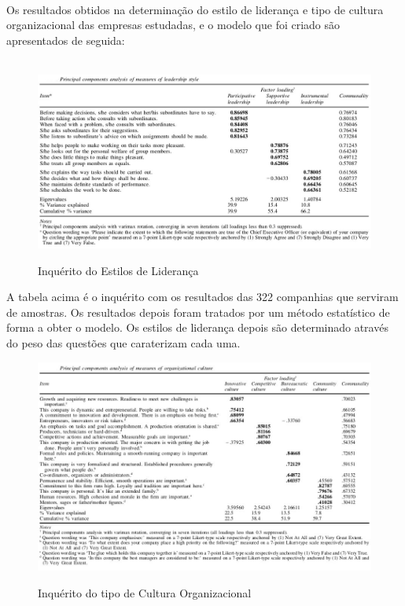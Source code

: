 \vspace{1cm}\\
Os resultados obtidos na determinação do estilo de liderança e tipo de cultura organizacional das empresas estudadas, e o modelo que foi criado são apresentados de seguida:\\
\\
\begin{figure}[H]
\centering
\includegraphics[scale=.5]{./image/OB/Leadership.jpg}\\
\caption{Inquérito do Estilos de Liderança \cite{article_1}}
\end{figure}\par
\newpage
A tabela acima é o inquérito com os resultados das 322 companhias que serviram de amostras. Os resultados depois foram tratados por um método estatístico de forma a obter o modelo. Os estilos de liderança depois são determinado através do peso das questões que caraterizam cada uma.
\vspace{1cm}
\begin{figure}[H]
\centering
\includegraphics[scale=.6]{./image/OB/Culture.jpg}\\
\caption{Inquérito do tipo de Cultura Organizacional \cite{article_1}}
\end{figure}\par
